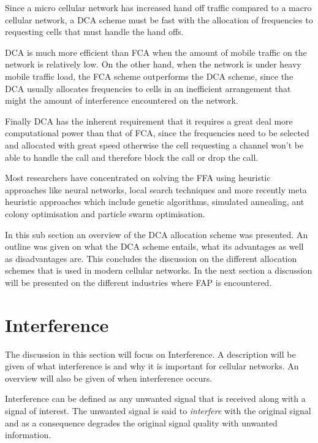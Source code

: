 Since a micro cellular network has increased hand off traffic compared to a macro cellular network, a DCA scheme must be fast with the allocation of frequencies to requesting cells that must handle the hand offs\cite{PrinciplesMobileCommunication,WirelessCommunications,MobileWirelessCommunications}.

DCA is much more efficient than FCA when the amount of mobile traffic on the network is relatively low. On the other hand, when the network is under heavy mobile traffic load, the FCA scheme outperforms the DCA scheme, since the DCA usually allocates frequencies to cells in an inefficient arrangement that might the amount of interference encountered on the network\cite{PrinciplesMobileCommunication,WirelessCommunications,MobileWirelessCommunications}.

Finally DCA has the inherent requirement that it requires a great deal more computational power than that of FCA, since the frequencies need to be selected and allocated with great speed otherwise the cell requesting a channel won't be able to handle the call and therefore block the call or drop the call\cite{PrinciplesMobileCommunication,WirelessCommunications,MobileWirelessCommunications}.

Most researchers have concentrated on solving the FFA using heuristic approaches like neural networks, local search techniques and more recently meta heuristic approaches which include genetic algorithms, simulated annealing, ant colony optimisation and particle swarm optimisation.

In this sub section an overview of the DCA allocation scheme was presented. An outline was given on what the DCA scheme entails, what its advantages as well as disadvantages are. This concludes the discussion on the different allocation schemes that is used in modern cellular networks. In the next section a discussion will be presented on the different industries where FAP is encountered.

\section{Interference}
\label{sec:Interference}
The discussion in this section will focus on Interference. A description will be given of what interference is and why it is important for cellular networks. An overview will also be given of when interference occurs.

Interference can be defined as any unwanted signal that is received along with a signal of interest. The unwanted signal is said to \emph{interfere} with the original signal and as a consequence degrades the original signal quality with unwanted information\cite{WirelessDigitalCommunications}.

